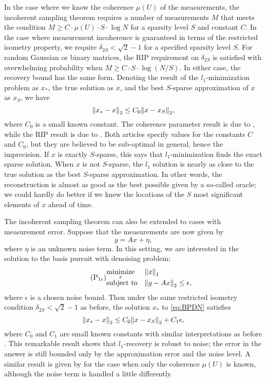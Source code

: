 In the case where we know the coherence $\mu(U)$ of the measurements, the incoherent sampling theorem requires a number of measurements $M$ that meets the condition $M \ge C \cdot \mu(U) \cdot S \cdot \log{N}$ for a sparsity level $S$ and constant $C$. In the case where measurement incoherence is guaranteed in terms of the restricted isometry property, we require $\delta_{2S} < \sqrt{2} - 1$ for a specified sparsity level $S$. For random Gaussian or binary matrices, the RIP requirement on $\delta_{2S}$ is satisfied with overwhelming probability when $M \ge C \cdot S \cdot \log{(N/S)}$. In either case, the recovery bound has the same form. Denoting the result of the $l_1$-minimization problem as $x_*$, the true solution as $x$, and the best $S$-sparse approximation of $x$ as $x_S$, we have
\begin{equation}
 \norm{2}{x_* - x} \le C_0 \norm{2}{x - x_S},
\end{equation}
where $C_0$ is a small known constant. The coherence parameter result is due to \textcite{CP11}, while the RIP result is due to \textcite{Can08}. Both articles specify values for the constants $C$ and $C_0$, but they are believed to be sub-optimal in general, hence the imprecision. If $x$ is exactly $S$-sparse, this says that $l_1$-minimization finds the exact sparse solution. When $x$ is not $S$-sparse, the $l_1$ solution is nearly as close to the true solution as the best $S$-sparse approximation. In other words, the reconstruction is almost as good as the best possible given by a so-called oracle; we could hardly do better if we knew the locations of the $S$ most significant elements of $x$ ahead of time.

The incoherent sampling theorem can also be extended to cases with measurement error. Suppose that the measurements are now given by
\begin{equation}
 y = Ax + \eta,
\end{equation}
where $\eta$ is an unknown noise term. In this setting, we are interested in the solution to the basis pursuit with denoising problem:
\begin{equation*}\tag{$\text{P}_{\text{1}\epsilon}$}\label{eq:BPDN}
 \begin{matrix*}[l]
  \underset{x}{\mathrm{minimize}} & \norm{1}{x}\\
  \text{subject to} & \norm{2}{y - Ax} \le \epsilon,
 \end{matrix*}
\end{equation*}
where $\epsilon$ is a chosen noise bound. Then under the same restricted isometry condition $\delta_{2S} < \sqrt{2} - 1$ as before, the solution $x_*$ to \eqref{eq:BPDN} satisfies
\begin{equation}
 \norm{2}{x_* - x} \le C_0 \norm{2}{x - x_S} + C_1 \epsilon,
\end{equation}
where $C_0$ and $C_1$ are small known constants with similar interpretations as before \autocite{Can08}. This remarkable result shows that $l_1$-recovery is robust to noise; the error in the answer is still bounded only by the approximation error and the noise level. A similar result is given by \textcite{CP11} for the case when only the coherence $\mu(U)$ is known, although the noise term is handled a little differently.

